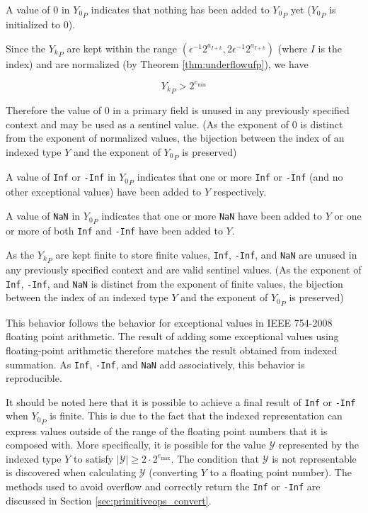 \documentclass[12pt]{article}
\providecommand{\min}{\ensuremath{\text{min}}}
\providecommand{\max}{\ensuremath{\text{max}}}
\theoremstyle{definition}
\numberwithin{equation}{section}
\numberwithin{figure}{section}
\begin{document}
      A value of $0$ in ${Y_0}_P$ indicates that nothing has been added to ${Y_0}_P$ yet (${Y_0}_P$ is initialized to $0$).

      Since the ${Y_k}_P$ are kept within the range $(\epsilon^{-1}  2^{a_{I + k}}, 2  \epsilon^{-1}  2^{a_{I + k}})$ (where $I$ is the index) and are normalized (by Theorem \ref{thm:underflowufp}), we have

      \begin{equation*}
        {Y_k}_P > 2^{e_{\min}}
      \end{equation*}

      Therefore the value of $0$ in a primary field is unused in any previously specified context and may be used as a sentinel value. (As the exponent of $0$ is distinct from the exponent of normalized values, the bijection between the index of an indexed type $Y$ and the exponent of ${Y_0}_P$ is preserved)

      A value of \texttt{Inf} or \texttt{-Inf} in ${Y_0}_P$ indicates that one or more \texttt{Inf} or \texttt{-Inf} (and no other exceptional values) have been added to $Y$ respectively.

      A value of \texttt{NaN} in ${Y_0}_P$ indicates that one or more \texttt{NaN} have been added to $Y$ or one or more of both \texttt{Inf} and \texttt{-Inf} have been added to $Y$.

      As the ${Y_k}_P$ are kept finite to store finite values, \texttt{Inf}, \texttt{-Inf}, and \texttt{NaN} are unused in any previously specified context and are valid sentinel values. (As the exponent of \texttt{Inf}, \texttt{-Inf}, and \texttt{NaN} is distinct from the exponent of finite values, the bijection between the index of an indexed type $Y$ and the exponent of ${Y_0}_P$ is preserved)

      This behavior follows the behavior for exceptional values in IEEE 754-2008 floating point arithmetic. The result of adding some exceptional values using floating-point arithmetic therefore matches the result obtained from indexed summation. As \texttt{Inf}, \texttt{-Inf}, and \texttt{NaN} add associatively, this behavior is reproducible.

      It should be noted here that it is possible to achieve a final result of \texttt{Inf} or \texttt{-Inf} when ${Y_0}_P$ is finite. This is due to the fact that the indexed representation can express values outside of the range of the floating point numbers that it is composed with. More specifically, it is possible for the value $\mathcal{Y}$ represented by the indexed type $Y$ to satisfy $|\mathcal{Y}| \geq 2 \cdot 2^{e_{\max}}$. The condition that $\mathcal{Y}$ is not representable is discovered when calculating $\mathcal{Y}$ (converting $Y$ to a floating point number). The methods used to avoid overflow and correctly return the \texttt{Inf} or \texttt{-Inf} are discussed in Section \ref{sec:primitiveops_convert}.
\end{document}
